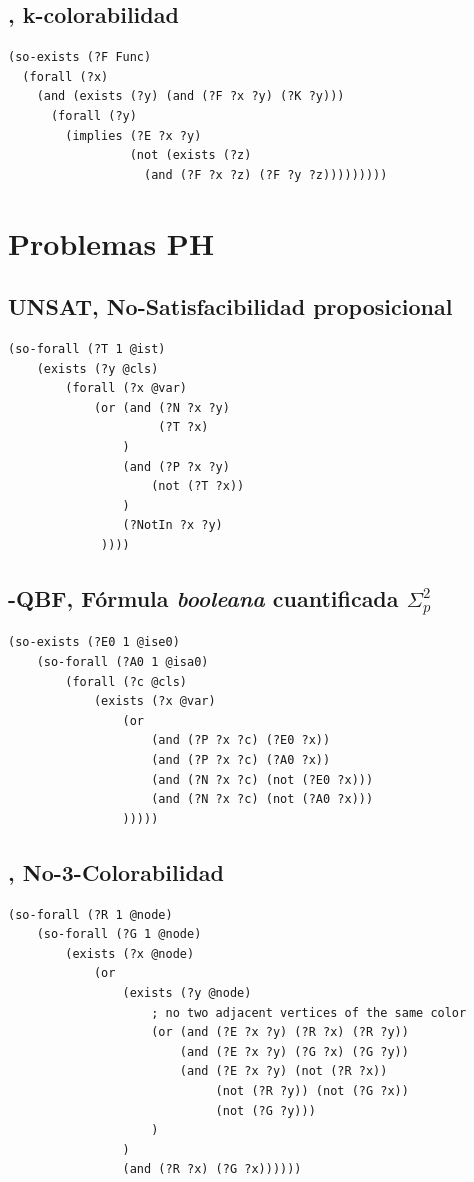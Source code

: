 \subsection{\KCOL, k-colorabilidad}
\begin{verbatim}
(so-exists (?F Func)
  (forall (?x) 
    (and (exists (?y) (and (?F ?x ?y) (?K ?y)))
      (forall (?y) 
        (implies (?E ?x ?y)
                 (not (exists (?z)
                   (and (?F ?x ?z) (?F ?y ?z)))))))))
\end{verbatim}

\section{Problemas PH}

\subsection{UNSAT, No-Satisfacibilidad proposicional}
\begin{verbatim}
(so-forall (?T 1 @ist)
    (exists (?y @cls)
        (forall (?x @var)
            (or (and (?N ?x ?y)
                     (?T ?x)
                )
                (and (?P ?x ?y)
                    (not (?T ?x))
                )
                (?NotIn ?x ?y)
             ))))
\end{verbatim}

\subsection{\qEA-QBF, Fórmula \textit{booleana} cuantificada $\Sigma_p^2$}
\begin{verbatim}
(so-exists (?E0 1 @ise0)
    (so-forall (?A0 1 @isa0)
        (forall (?c @cls)
            (exists (?x @var)
                (or
                    (and (?P ?x ?c) (?E0 ?x))
                    (and (?P ?x ?c) (?A0 ?x))
                    (and (?N ?x ?c) (not (?E0 ?x)))
                    (and (?N ?x ?c) (not (?A0 ?x)))
                )))))
\end{verbatim}

\subsection{\coCOL, No-3-Colorabilidad}

\begin{verbatim}
(so-forall (?R 1 @node)
    (so-forall (?G 1 @node)
        (exists (?x @node)
            (or 
                (exists (?y @node)
                    ; no two adjacent vertices of the same color
                    (or (and (?E ?x ?y) (?R ?x) (?R ?y))
                        (and (?E ?x ?y) (?G ?x) (?G ?y))
                        (and (?E ?x ?y) (not (?R ?x)) 
                             (not (?R ?y)) (not (?G ?x)) 
                             (not (?G ?y)))
                    )
                )
                (and (?R ?x) (?G ?x))))))
\end{verbatim}
